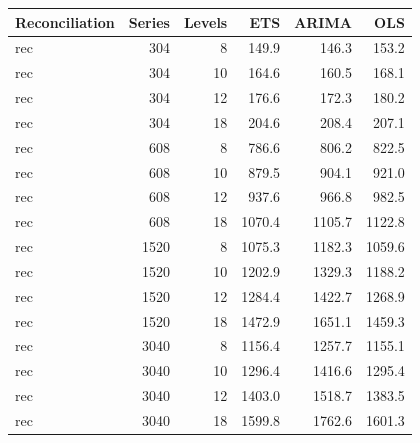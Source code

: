 \documentclass[11pt,a4paper,]{article}
\let\origtable\table
\let\endorigtable\endtable
\renewenvironment{table}[1][2] {
    \expandafter\origtable\expandafter[!htbp]
} {
    \endorigtable
}
\begin{document}
\begin{table}[!h]

\caption{\label{tab:TourismdatasimrollinglevelNS}Mean RMSE by number of hierarchy levels, number of bottom-level series, method, with reconciliation. Simulated series has error value 0.5. Forecasting uses rolling origin for a 24-month horizon.}
\centering
\begin{tabular}[t]{lrrrrr}
\toprule
Reconciliation & Series & Levels & ETS & ARIMA & OLS\\
\midrule
rec & 304 & 8 & 149.9 & 146.3 & 153.2\\
rec & 304 & 10 & 164.6 & 160.5 & 168.1\\
rec & 304 & 12 & 176.6 & 172.3 & 180.2\\
rec & 304 & 18 & 204.6 & 208.4 & 207.1\\
rec & 608 & 8 & 786.6 & 806.2 & 822.5\\
rec & 608 & 10 & 879.5 & 904.1 & 921.0\\
rec & 608 & 12 & 937.6 & 966.8 & 982.5\\
rec & 608 & 18 & 1070.4 & 1105.7 & 1122.8\\
rec & 1520 & 8 & 1075.3 & 1182.3 & 1059.6\\
rec & 1520 & 10 & 1202.9 & 1329.3 & 1188.2\\
rec & 1520 & 12 & 1284.4 & 1422.7 & 1268.9\\
rec & 1520 & 18 & 1472.9 & 1651.1 & 1459.3\\
rec & 3040 & 8 & 1156.4 & 1257.7 & 1155.1\\
rec & 3040 & 10 & 1296.4 & 1416.6 & 1295.4\\
rec & 3040 & 12 & 1403.0 & 1518.7 & 1383.5\\
rec & 3040 & 18 & 1599.8 & 1762.6 & 1601.3\\
\bottomrule
\end{tabular}
\end{table}
\end{document}
